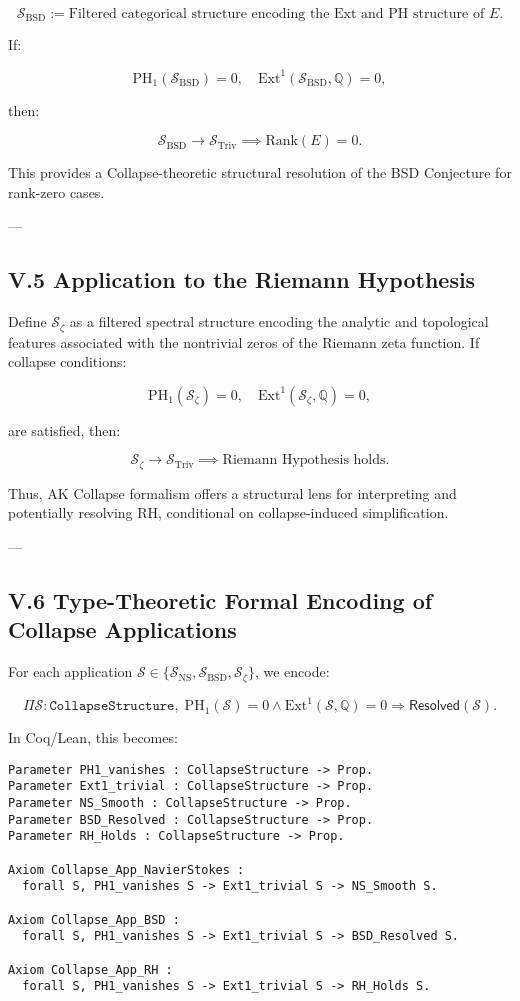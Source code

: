 \documentclass[11pt]{article}
\begin{document}
\[
\mathcal{S}_{\mathrm{BSD}} := \text{Filtered categorical structure encoding the Ext and PH structure of } E.
\]

If:

\[
\mathrm{PH}_1(\mathcal{S}_{\mathrm{BSD}}) = 0, \quad \mathrm{Ext}^1(\mathcal{S}_{\mathrm{BSD}}, \mathbb{Q}) = 0,
\]

then:

\[
\mathcal{S}_{\mathrm{BSD}} \longrightarrow \mathcal{S}_{\mathrm{Triv}} \implies \mathrm{Rank}(E) = 0.
\]

This provides a Collapse-theoretic structural resolution of the BSD Conjecture for rank-zero cases.

---

\subsection*{V.5 Application to the Riemann Hypothesis}

Define $\mathcal{S}_{\zeta}$ as a filtered spectral structure encoding the analytic and topological features associated with the nontrivial zeros of the Riemann zeta function.  
If collapse conditions:

\[
\mathrm{PH}_1(\mathcal{S}_{\zeta}) = 0, \quad \mathrm{Ext}^1(\mathcal{S}_{\zeta}, \mathbb{Q}) = 0,
\]

are satisfied, then:

\[
\mathcal{S}_{\zeta} \longrightarrow \mathcal{S}_{\mathrm{Triv}} \implies \text{Riemann Hypothesis holds}.
\]

Thus, AK Collapse formalism offers a structural lens for interpreting and potentially resolving RH, conditional on collapse-induced simplification.

---

\subsection*{V.6 Type-Theoretic Formal Encoding of Collapse Applications}

For each application $\mathcal{S} \in \{\mathcal{S}_{\mathrm{NS}}, \mathcal{S}_{\mathrm{BSD}}, \mathcal{S}_{\zeta}\}$, we encode:

\[
\Pi \mathcal{S} : \texttt{CollapseStructure},\;
\mathrm{PH}_1(\mathcal{S}) = 0 \wedge \mathrm{Ext}^1(\mathcal{S}, \mathbb{Q}) = 0
\Rightarrow
\mathsf{Resolved}(\mathcal{S}).
\]

In Coq/Lean, this becomes:

\begin{lstlisting}[language=Coq]
Parameter PH1_vanishes : CollapseStructure -> Prop.
Parameter Ext1_trivial : CollapseStructure -> Prop.
Parameter NS_Smooth : CollapseStructure -> Prop.
Parameter BSD_Resolved : CollapseStructure -> Prop.
Parameter RH_Holds : CollapseStructure -> Prop.

Axiom Collapse_App_NavierStokes :
  forall S, PH1_vanishes S -> Ext1_trivial S -> NS_Smooth S.

Axiom Collapse_App_BSD :
  forall S, PH1_vanishes S -> Ext1_trivial S -> BSD_Resolved S.

Axiom Collapse_App_RH :
  forall S, PH1_vanishes S -> Ext1_trivial S -> RH_Holds S.
\end{lstlisting}
\end{document}
